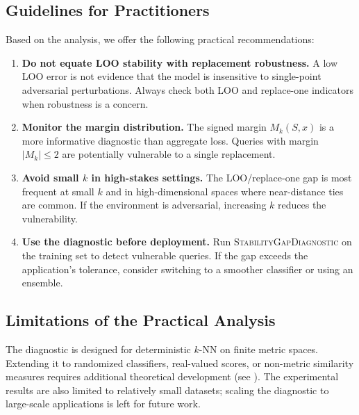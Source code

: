 \subsection{Guidelines for Practitioners}

Based on the analysis, we offer the following practical recommendations:

\begin{enumerate}[leftmargin=*,label=(\arabic*)]
    \item \textbf{Do not equate LOO stability with replacement robustness.}
        A low LOO error is not evidence that the model is insensitive to
        single-point adversarial perturbations. Always check both LOO and
        replace-one indicators when robustness is a concern.
    \item \textbf{Monitor the margin distribution.} The signed margin
        $M_k(S, x)$ is a more informative diagnostic than aggregate loss.
        Queries with margin $|M_k| \le 2$ are potentially vulnerable to a
        single replacement.
    \item \textbf{Avoid small $k$ in high-stakes settings.} The LOO/replace-one
        gap is most frequent at small $k$ and in high-dimensional spaces where
        near-distance ties are common. If the environment is adversarial,
        increasing $k$ reduces the vulnerability.
    \item \textbf{Use the diagnostic before deployment.} Run
        \textsc{StabilityGapDiagnostic} on the training set to detect
        vulnerable queries. If the gap exceeds the application's tolerance,
        consider switching to a smoother classifier or using an ensemble.
\end{enumerate}

\subsection{Limitations of the Practical Analysis}

The diagnostic is designed for deterministic $k$-NN on finite metric spaces.
Extending it to randomized classifiers, real-valued scores, or non-metric
similarity measures requires additional theoretical development (see
). The experimental results are also limited to
relatively small datasets; scaling the diagnostic to large-scale applications
is left for future work.
